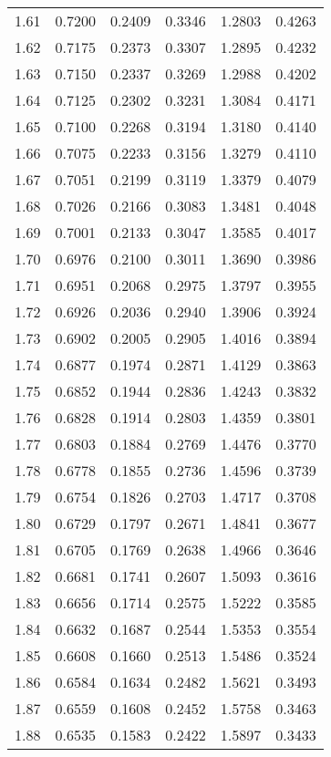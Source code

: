 \documentclass{article}
\begin{document}
\begin{longtable}{cccccc}
1.61 & 0.7200 & 0.2409 & 0.3346 & 1.2803 & 0.4263 \\
1.62 & 0.7175 & 0.2373 & 0.3307 & 1.2895 & 0.4232 \\
1.63 & 0.7150 & 0.2337 & 0.3269 & 1.2988 & 0.4202 \\
1.64 & 0.7125 & 0.2302 & 0.3231 & 1.3084 & 0.4171 \\
1.65 & 0.7100 & 0.2268 & 0.3194 & 1.3180 & 0.4140 \\
1.66 & 0.7075 & 0.2233 & 0.3156 & 1.3279 & 0.4110 \\
1.67 & 0.7051 & 0.2199 & 0.3119 & 1.3379 & 0.4079 \\
1.68 & 0.7026 & 0.2166 & 0.3083 & 1.3481 & 0.4048 \\
1.69 & 0.7001 & 0.2133 & 0.3047 & 1.3585 & 0.4017 \\
1.70 & 0.6976 & 0.2100 & 0.3011 & 1.3690 & 0.3986 \\
1.71 & 0.6951 & 0.2068 & 0.2975 & 1.3797 & 0.3955 \\
1.72 & 0.6926 & 0.2036 & 0.2940 & 1.3906 & 0.3924 \\
1.73 & 0.6902 & 0.2005 & 0.2905 & 1.4016 & 0.3894 \\
1.74 & 0.6877 & 0.1974 & 0.2871 & 1.4129 & 0.3863 \\
1.75 & 0.6852 & 0.1944 & 0.2836 & 1.4243 & 0.3832 \\
1.76 & 0.6828 & 0.1914 & 0.2803 & 1.4359 & 0.3801 \\
1.77 & 0.6803 & 0.1884 & 0.2769 & 1.4476 & 0.3770 \\
1.78 & 0.6778 & 0.1855 & 0.2736 & 1.4596 & 0.3739 \\
1.79 & 0.6754 & 0.1826 & 0.2703 & 1.4717 & 0.3708 \\
1.80 & 0.6729 & 0.1797 & 0.2671 & 1.4841 & 0.3677 \\
1.81 & 0.6705 & 0.1769 & 0.2638 & 1.4966 & 0.3646 \\
1.82 & 0.6681 & 0.1741 & 0.2607 & 1.5093 & 0.3616 \\
1.83 & 0.6656 & 0.1714 & 0.2575 & 1.5222 & 0.3585 \\
1.84 & 0.6632 & 0.1687 & 0.2544 & 1.5353 & 0.3554 \\
1.85 & 0.6608 & 0.1660 & 0.2513 & 1.5486 & 0.3524 \\
1.86 & 0.6584 & 0.1634 & 0.2482 & 1.5621 & 0.3493 \\
1.87 & 0.6559 & 0.1608 & 0.2452 & 1.5758 & 0.3463 \\
1.88 & 0.6535 & 0.1583 & 0.2422 & 1.5897 & 0.3433 \\

\end{longtable}
\end{document}
